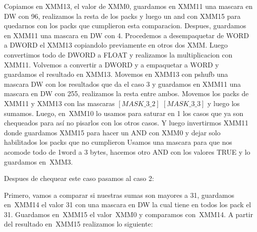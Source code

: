 Copiamos en XMM13, el valor de XMM0, guardamos en XMM11 una mascara en DW con 96, realizamos la resta de los packs y luego un and 
con XMM15 para quedarnos con los packs que cumplieron esta comparacion. Despues, guardamos en XMM11 una mascara en DW con 4.
Procedemos a desempaquetar de WORD a DWORD el XMM13 copiandolo previamente en otros dos XMM. Luego convertimos todo de DWORD
a FLOAT y realizamos la multiplicacion con XMM11. Volvemos a convertir a DWORD y a empaquetar a WORD y guardamos el resultado 
en XMM13. \newline
Movemos en XMM13 con pshufb una mascara DW con los resultados que da el caso 3 y guardamos en XMM11 una mascara en DW con 255, 
realizamos la resta entre ambos. Movemos los packs de XMM11 y XMM13 con las mascaras $[MASK\_3\_2]$ $[MASK\_3\_3] $ y luego
los sumamos. \newline
Luego, en\ XMM10 lo usamos para saturar en 1 los casos que ya son chequeados para así no pisarlos con los otros casos. Y luego
invertirmos XMM11 donde guardamos XMM15 para hacer un AND con XMM0 y dejar solo habilitados los packs que no cumplieron\newline
Usamos una mascara para que nos acomode todo de 1word a 3 bytes, hacemos otro AND con los valores TRUE y lo guardamos en\ XMM3. \newline

Despues de chequear este caso pasamos al caso 2: \newline

Primero, vamos a comparar si nuestras sumas son mayores a 31, guardamos en\ XMM14 el valor 31 con una mascara en DW la cual tiene en todos los pack
el 31. Guardamos en\ XMM15 el valor\ XMM0 y comparamos con\ XMM14.
A partir del resultado en\ XMM15 realizamos lo siguiente: \newline

